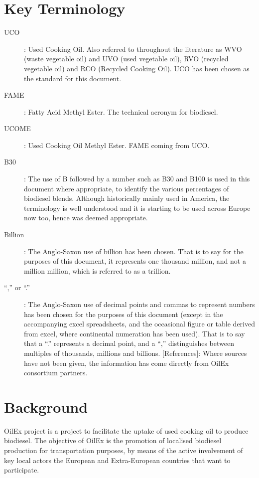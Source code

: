 \documentclass[11pt,fleqn]{book} %
\begin{document}


\section{Key Terminology}
\begin{description}
	\item[UCO]: Used Cooking Oil. Also referred to throughout the literature as WVO (waste vegetable
oil) and UVO (used vegetable oil), RVO (recycled vegetable oil) and RCO (Recycled Cooking
Oil). UCO has been chosen as the standard for this document.
    \item[FAME]: Fatty Acid Methyl Ester. The technical acronym for biodiesel.
    \item[UCOME]: Used Cooking Oil Methyl Ester. FAME coming from UCO.
	\item[B30]: The use of B followed by a number such as B30 and B100 is used in this document
where appropriate, to identify the various percentages of biodiesel blends. Although
historically mainly used in America, the terminology is well understood and it is starting to be
used across Europe now too, hence was deemed appropriate.
    \item[Billion]: The Anglo-Saxon use of billion has been chosen. That is to say for the purposes of
this document, it represents one thousand million, and not a million million, which is referred
to as a trillion.
    \item[“,” or “.”]: The Anglo-Saxon use of decimal points and commas to represent numbers has
been chosen for the purposes of this document (except in the accompanying excel
spreadsheets, and the occasional figure or table derived from excel, where continental
numeration has been used). That is to say that a “.” represents a decimal point, and a “,”
distinguishes between multiples of thousands, millions and billions.
[References]: Where sources have not been given, the information has come directly from
OilEx consortium partners.
    \end{description}


\section{Background}
OilEx project is a project to facilitate the uptake of used cooking oil to produce biodiesel. The objective of OilEx is the promotion of localised biodiesel production for transportation purposes, by means of the active involvement of key local actors the European and Extra-European countries that want to participate.
\end{document}
